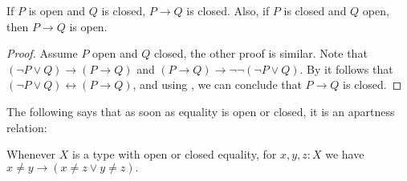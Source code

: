 %
%
\begin{lemma}\label{ImplicationOpenClosed}
  If $P$ is open and $Q$ is closed, $P\to Q$ is closed. 
  Also, if $P$ is closed and $Q$ open, then $P\to Q$ is open. 
\end{lemma}
\begin{proof}
  Assume $P$ open and $Q$ closed, the other proof is similar. 
  Note that $(\neg P \vee Q) \to (P \to Q)$ and 
  $(P\to Q)\to \neg\neg(\neg P \vee Q)$. 
  By  it follows that 
  $(\neg P \vee Q)\leftrightarrow (P \to Q)$, and using , 
  we can conclude that $P\to Q$ is closed. 
\end{proof}
%
The following says that as soon as equality is open or closed, 
it is an apartness relation:
\begin{lemma}\label{StoneEqualityApartness}
  Whenever $X$ is a type with open or closed equality, for $x,y,z:X$ we have 
%
    $
  x \neq y \to (x\neq z \vee y \neq z).
  $
\end{lemma}
